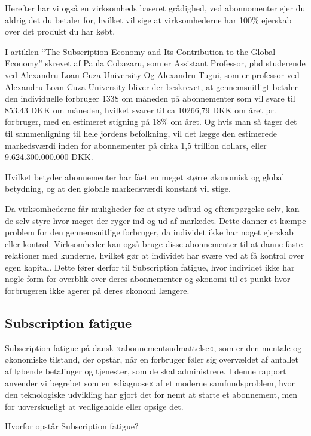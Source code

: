 Herefter har vi også en virksomheds baseret grådighed, ved abonnomenter ejer du
aldrig det du betaler for, hvilket vil sige at virksomhederne har 100\% ejerskab over det
produkt du har købt.

I artiklen “The Subscription Economy and Its Contribution to the Global Economy” skrevet af Paula Cobazaru, som er Assistant Professor, phd studerende ved Alexandru Loan Cuza University Og Alexandru Tugui, som er professor ved Alexandru Loan Cuza University
bliver der beskrevet, at gennemsnitligt betaler den individuelle forbruger 133\$ om måneden på abonnementer som vil svare til 853,43 DKK om måneden, hvilket svarer til ca 10266,79 DKK om året pr. forbruger, med en estimeret stigning på 18\% om året. Og hvis man så tager det til sammenligning til hele jordens befolkning, vil det lægge den estimerede markedsværdi inden for abonnementer på cirka 1,5 trillion dollars, eller 9.624.300.000.000 DKK.

Hvilket betyder abonnementer har fået en meget større økonomisk og global betydning, og at den globale markedsværdi konstant vil stige.

Da virksomhederne får muligheder for at styre udbud og efterspørgelse selv, kan de selv styre hvor meget der ryger ind og ud af markedet. Dette danner et kæmpe problem for den gennemsnitlige forbruger, da individet ikke har noget ejerskab eller kontrol. Virksomheder kan også bruge disse abonnementer til at danne faste relationer med kunderne, hvilket gør at individet har svære ved at få kontrol over egen kapital. Dette fører derfor til Subscription fatigue, hvor individet ikke har nogle form for overblik over deres abonnementer og økonomi til et punkt hvor forbrugeren ikke agerer på deres økonomi længere.


\subsection{Subscription fatigue}
Subscription fatigue på dansk »abonnementsudmattelse«, som er den mentale og økonomiske tilstand, der opstår, når en forbruger føler sig overvældet af antallet af løbende betalinger og tjenester, som de skal administrere. I denne rapport anvender vi begrebet som en »diagnose« af et moderne samfundsproblem, hvor den teknologiske udvikling har gjort det for nemt at starte et abonnement, men for uoverskueligt at vedligeholde eller opsige det.


Hvorfor opstår Subscription fatigue? 


